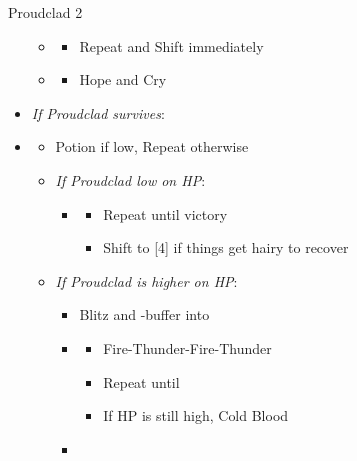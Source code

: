 \begin{battle}{Proudclad 2}
\begin{multicols}{2}
\begin{itemize}
            \begin{itemize}
              \item \first
                    \begin{itemize}
                      \item Repeat and Shift immediately
                    \end{itemize}
              \item \second
                    \begin{itemize}
                      \item Hope and Cry
                    \end{itemize}
            \end{itemize}
      \item \textit{If Proudclad survives}:
      \item \fourth
            \begin{itemize}
              \item Potion if low, Repeat otherwise
              \item \textit{If Proudclad low on HP}:
                    \begin{itemize}
                      \item \second
                            \begin{itemize}
                              \item Repeat until victory
                              \item Shift to [4] if things get hairy to recover
                            \end{itemize}
                    \end{itemize}
              \item \textit{If Proudclad is higher on HP}:
                    \begin{itemize}
                      \item Blitz and \rav-buffer into
                      \item \sixth
                            \begin{itemize}
                              \item Fire-Thunder-Fire-Thunder
                              \item Repeat until \stagger
                              \item If HP is still high, Cold Blood
                            \end{itemize}
                      \item \second

\end{itemize}
\end{itemize}
\end{itemize}
\end{multicols}
\end{battle}
